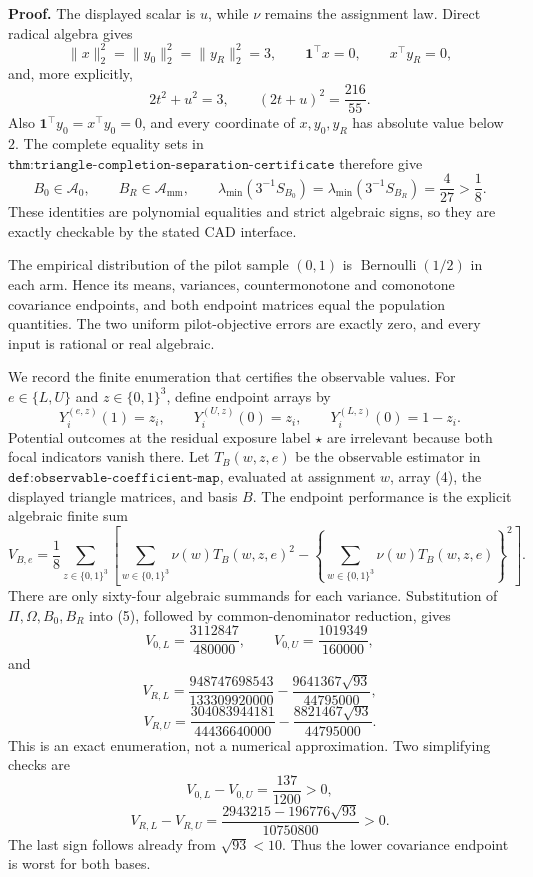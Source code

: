 \textbf{Proof.}
The displayed scalar is \(u\), while \(\nu\) remains the assignment law.  Direct radical algebra gives
\[
\lVert x\rVert_2^2=\lVert y_0\rVert_2^2=\lVert y_R\rVert_2^2=3,
\qquad
\mathbf1^\top x=0,
\qquad
x^\top y_R=0,
\tag{1}
\]
and, more explicitly,
\[
2t^2+u^2=3,
\qquad
(2t+u)^2=\frac{216}{55}.
\tag{2}
\]
Also \(\mathbf1^\top y_0=x^\top y_0=0\), and every coordinate of \(x,y_0,y_R\) has absolute value below \(2\).  The complete equality sets in \(\texttt{thm:triangle-completion-separation-certificate}\) therefore give
\[
B_0\in\mathcal A_0,
\qquad
B_R\in\mathcal A_{\mathrm{mm}},
\qquad
\lambda_{\min}(3^{-1}S_{B_0})
=\lambda_{\min}(3^{-1}S_{B_R})=\frac4{27}>\frac18.
\tag{3}
\]
These identities are polynomial equalities and strict algebraic signs, so they are exactly checkable by the stated CAD interface.

The empirical distribution of the pilot sample \((0,1)\) is \(\operatorname{Bernoulli}(1/2)\) in each arm.  Hence its means, variances, countermonotone and comonotone covariance endpoints, and both endpoint matrices equal the population quantities.  The two uniform pilot-objective errors are exactly zero, and every input is rational or real algebraic.

We record the finite enumeration that certifies the observable values.  For \(e\in\{L,U\}\) and \(z\in\{0,1\}^3\), define endpoint arrays by
\[
Y_i^{(e,z)}(1)=z_i,
\qquad
Y_i^{(U,z)}(0)=z_i,
\qquad
Y_i^{(L,z)}(0)=1-z_i.
\tag{4}
\]
Potential outcomes at the residual exposure label \(\star\) are irrelevant because both focal indicators vanish there.  Let \(T_B(w,z,e)\) be the observable estimator in \(\texttt{def:observable-coefficient-map}\), evaluated at assignment \(w\), array (4), the displayed triangle matrices, and basis \(B\).  The endpoint performance is the explicit algebraic finite sum
\[
V_{B,e}=\frac18\sum_{z\in\{0,1\}^3}
\left[
\sum_{w\in\{0,1\}^3}\nu(w)T_B(w,z,e)^2
-\left\{\sum_{w\in\{0,1\}^3}\nu(w)T_B(w,z,e)\right\}^2
\right].
\tag{5}
\]
There are only sixty-four algebraic summands for each variance.  Substitution of \(\Pi,\Omega,B_0,B_R\) into (5), followed by common-denominator reduction, gives
\[
V_{0,L}=\frac{3112847}{480000},
\qquad
V_{0,U}=\frac{1019349}{160000},
\tag{6}
\]
and
\[
V_{R,L}=\frac{948747698543}{133309920000}
-\frac{9641367\sqrt{93}}{44795000},
\tag{7}
\]
\[
V_{R,U}=\frac{304083944181}{44436640000}
-\frac{8821467\sqrt{93}}{44795000}.
\tag{8}
\]
This is an exact enumeration, not a numerical approximation.  Two simplifying checks are
\[
V_{0,L}-V_{0,U}=\frac{137}{1200}>0,
\tag{9}
\]
\[
V_{R,L}-V_{R,U}
=\frac{2943215-196776\sqrt{93}}{10750800}>0.
\tag{10}
\]
The last sign follows already from \(\sqrt{93}<10\).  Thus the lower covariance endpoint is worst for both bases.

